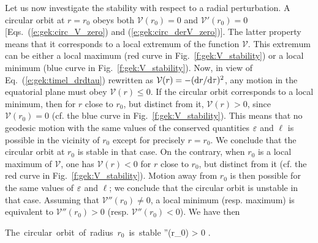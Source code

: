 Let us now investigate the stability with respect to a radial perturbation.
A circular orbit at $r=r_0$ obeys both $\mathcal{V}(r_0) = 0$ and $\mathcal{V}'(r_0) = 0$
[Eqs.~(\ref{e:gek:circ_V_zero}) and (\ref{e:gek:circ_derV_zero})]. The latter property means that
it corresponds to a local extremum of the function $\mathcal{V}$. This extremum can be either
a local maximum (red curve in Fig.~\ref{f:gek:V_stability}) or a local minimum
(blue curve in Fig.~\ref{f:gek:V_stability}).
Now, in view of Eq.~(\ref{e:gek:timel_drdtau}) rewritten as $\mathcal{V}(r) = - (\mathrm{d} r/ \mathrm{d}\tau)^2$, any motion in the equatorial plane must obey $\mathcal{V}(r) \leq 0$. If the circular orbit
corresponds to a local minimum, then for $r$ close to $r_0$, but distinct from it,
$\mathcal{V}(r) > 0$, since $\mathcal{V}(r_0) = 0$ (cf. the blue curve in Fig.~\ref{f:gek:V_stability}). This means that no geodesic motion with the same values of the
conserved quantities $\varepsilon$ and $\ell$
is possible in the vicinity of $r_0$ except for precisely $r=r_0$. We conclude that the circular orbit at $r_0$ is stable in that case.
On the contrary, when $r_0$ is a local maximum of $\mathcal{V}$, one has
$\mathcal{V}(r) < 0$
for $r$ close to $r_0$, but distinct from it (cf. the red curve in Fig.~\ref{f:gek:V_stability}).
Motion away from $r_0$ is then possible for the same values of $\varepsilon$ and $\ell$; we conclude that the circular orbit is unstable in that
case. Assuming that $\mathcal{V}''(r_0)\neq 0$, a local minimum (resp. maximum) is equivalent to
$\mathcal{V}''(r_0) > 0$ (resp. $\mathcal{V}''(r_0) < 0$). We have then
\begin{prop}
\be \label{e:gek:stability_circ_V}
    \mbox{The circular orbit of radius $r_0$ is stable} \iff
    ''(r_0) > 0 .
\ee
\end{prop}

